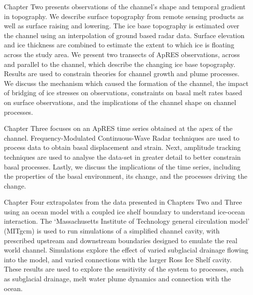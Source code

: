 Chapter Two presents observations of the channel's shape and temporal gradient in topography. We describe surface topography  from remote sensing products as well as surface raising and lowering. The ice base topography is estimated over the channel using an interpolation of ground based radar data. Surface elevation and ice thickness are combined to estimate the extent to which ice is floating across the study area.  We present two transects of ApRES observations, across and parallel to the channel, which describe the changing ice base topography.   Results are used to constrain theories for channel growth and plume processes. We discuss the mechanism which caused the formation of the channel, the impact of bridging of ice stresses on observations, constraints on basal melt rates based on surface observations, and the implications of the channel shape on channel processes. 



Chapter Three focuses on an ApRES time series obtained at the apex of the channel.  Frequency-Modulated Continuous-Wave Radar techniques are used to process data to obtain basal displacement and strain.  Next, amplitude tracking techniques are used to analyse the data-set in greater detail to better constrain basal processes. Lastly, we discuss the implications of the time series, including the properties of the basal environment, its change, and the processes driving the change.


Chapter Four extrapolates from the data presented in Chapters Two and Three using an ocean model with a coupled ice shelf boundary to understand ice-ocean interaction. The `Massachusetts Institute of Technology general circulation model' (MITgcm) is used to run simulations of a simplified channel cavity, with prescribed upstream and downstream boundaries designed to emulate the real world channel. Simulations explore the effect of varied subglacial drainage flowing into the model, and varied connections with the larger Ross Ice Shelf cavity. These results are  used to explore the sensitivity of the system to processes, such as subglacial drainage, melt water plume dynamics and connection with the ocean.

